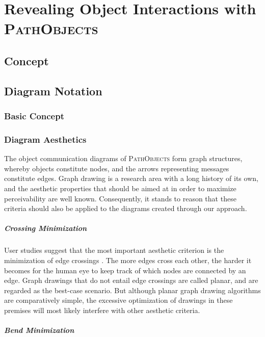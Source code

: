 \chapter{Revealing Object Interactions with \textsc{PathObjects}}
\label{c:approach}

\section{Concept}

\section{Diagram Notation}
\subsection{Basic Concept}
\subsection{Diagram Aesthetics}
The object communication diagrams of \textsc{PathObjects} form graph structures, whereby  objects constitute nodes, and the arrows representing messages constitute edges.
Graph drawing is a research area with a long history of its own, and the aesthetic properties that should be aimed at in order to maximize perceivability are well known.
Consequently, it stands to reason that these criteria should also be applied to the diagrams created through our approach.

\paragraph{Crossing Minimization} User studies suggest that the most important aesthetic criterion is the minimization of edge crossings \cite{purchase_effective_2000, purchase_graph_2004, purchase_graph_2010}.
The more edges cross each other, the harder it becomes for the human eye to keep track of which nodes are connected by an edge.
Graph drawings that do not entail edge crossings are called planar, and are regarded as the best-case scenario.
But although planar graph drawing algorithms are comparatively simple, the excessive optimization of drawings in these premises will most likely interfere with other aesthetic criteria.

\paragraph{Bend Minimization} 


